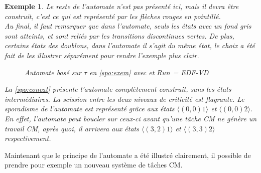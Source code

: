 \documentclass[12pt,a4paper,oneside]{book}
\theoremstyle{break}
\newtheorem{exem}{Exemple}[chapter]
\theoremstyle{breakplain}
\begin{document}
\begin{exem}
Le reste de l'automate n'est pas présenté ici, mais il devra être construit, c'est ce qui est représenté par les flèches rouges en pointillé.\\
Au final, il faut remarquer que dans l'automate, seuls les états avec un fond gris sont atteints, et sont reliés par les transitions discontinues vertes. De plus, certains états des doublons, dans l'automate il s'agit du même état, le choix a été fait de les illustrer séparément pour rendre l'exemple plus clair.

\begin{figure}[h]
    \centering
    \resizebox{\textwidth}{!}{
    \fontsize{28pt}{12pt}\selectfont
    
    }
    
\caption{Automate basé sur $\tau$ en \autoref{spo:exem} avec et $Run$ = \textit{EDF-VD}}
\label{spo:concat}
\end{figure}

La \autoref{spo:concat} présente l'automate complètement construit, sans les états intermédiaires. La scission entre les deux niveaux de criticité est flagrante. Le sporadisme de l'automate est représenté grâce aux états $\langle (0,0)1 \rangle $ et $\langle (0,0)2 \rangle $. En effet, l'automate peut boucler sur ceux-ci avant qu'une tâche CM ne génère un travail CM, après quoi, il arrivera aux états $\langle (3,2)1 \rangle $ et $\langle (3,3)2 \rangle $ respectivement.
\end{exem}

Maintenant que le principe de l'automate a été illustré clairement, il possible de prendre pour exemple un nouveau système de tâches CM.\\
\end{document}
